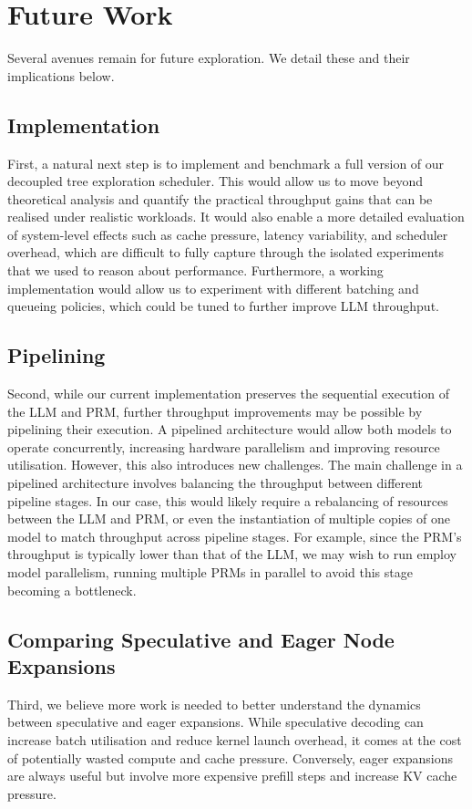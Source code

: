 \documentclass[11pt,twoside]{report}
\begin{document}
\section{Future Work}
Several avenues remain for future exploration.
We detail these and their implications below.

\subsection{Implementation}
First, a natural next step is to implement and benchmark a full version of our decoupled tree exploration scheduler.
This would allow us to move beyond theoretical analysis and quantify the practical throughput gains that can be realised under realistic workloads.
It would also enable a more detailed evaluation of system-level effects such as cache pressure, latency variability, and scheduler overhead, which are difficult to fully capture through the isolated experiments that we used to reason about performance.
Furthermore, a working implementation would allow us to experiment with different batching and queueing policies, which could be tuned to further improve LLM throughput.

\subsection{Pipelining}
Second, while our current implementation preserves the sequential execution of the LLM and PRM, further throughput improvements may be possible by pipelining their execution.
A pipelined architecture would allow both models to operate concurrently, increasing hardware parallelism and improving resource utilisation.
However, this also introduces new challenges.
The main challenge in a pipelined architecture involves balancing the throughput between different pipeline stages.
In our case, this would likely require a rebalancing of resources between the LLM and PRM, or even the instantiation of multiple copies of one model to match throughput across pipeline stages.
For example, since the PRM's throughput is typically lower than that of the LLM, we may wish to run employ model parallelism, running multiple PRMs in parallel to avoid this stage becoming a bottleneck.

\subsection{Comparing Speculative and Eager Node Expansions}
Third, we believe more work is needed to better understand the dynamics between speculative and eager expansions.
While speculative decoding can increase batch utilisation and reduce kernel launch overhead, it comes at the cost of potentially wasted compute and cache pressure.
Conversely, eager expansions are always useful but involve more expensive prefill steps and increase KV cache pressure.
\end{document}

